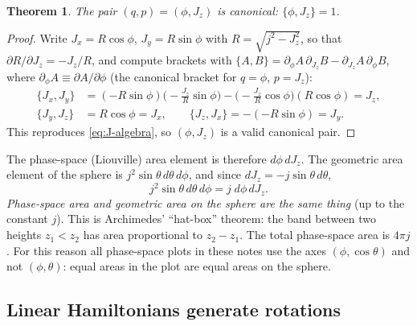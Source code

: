 \documentclass[11pt,a4paper]{article}
\newtheorem*{theorem*}{Theorem}
\newcommand{\PB}[2]{\{#1,#2\}}
\begin{document}
\begin{theorem*}
The pair $(q,p) = (\phi, J_z)$ is canonical: $\PB{\phi}{J_z} = 1$.
\end{theorem*}
\begin{proof}
Write $J_x = R\cos\phi$, $J_y = R\sin\phi$ with $R = \sqrt{j^2 - J_z^2}$, so that $\partial R/\partial J_z =
-J_z/R$, and compute brackets with $\PB{A}{B} = \partial_\phi A\,\partial_{J_z}B - \partial_{J_z}A\,\partial_\phi B$, where $\partial_\phi A \equiv
\partial A/\partial\phi$ (the canonical bracket for $q = \phi$, $p = J_z$):
\begin{align*}
  \PB{J_x}{J_y} &= (-R\sin\phi)\Big(-\tfrac{J_z}{R}\sin\phi\Big) - \Big(-\tfrac{J_z}{R}\cos\phi\Big)(R\cos\phi) = J_z, \\
  \PB{J_y}{J_z} &= R\cos\phi = J_x, \qquad \PB{J_z}{J_x} = -(-R\sin\phi) = J_y .
\end{align*}
This reproduces \eqref{eq:J-algebra}, so $(\phi,J_z)$ is a valid canonical pair.
\end{proof}

The phase-space (Liouville) area element is therefore $d\phi\, dJ_z$. The geometric area element of the sphere is
$j^2\sin\theta\, d\theta\, d\phi$, and since $dJ_z = -j\sin\theta\, d\theta$,
\begin{equation}\label{eq:area}
  j^2 \sin\theta\, d\theta\, d\phi = j\; d\phi\, dJ_z .
\end{equation}
\emph{Phase-space area and geometric area on the sphere are the same thing} (up to the constant $j$). This is
Archimedes' ``hat-box'' theorem: the band between two heights $z_1<z_2$ has area proportional to $z_2-z_1$. The total
phase-space area is $4\pi j$. For this reason all phase-space plots in these notes use the axes $(\phi, \cos\theta)$
and not $(\phi,\theta)$: equal areas in the plot are equal areas on the sphere.

\subsection{Linear Hamiltonians generate rotations}\label{sec:precession}
\end{document}
